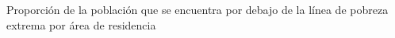 Proporción de la población que se encuentra por debajo de la línea de pobreza extrema por área de residencia